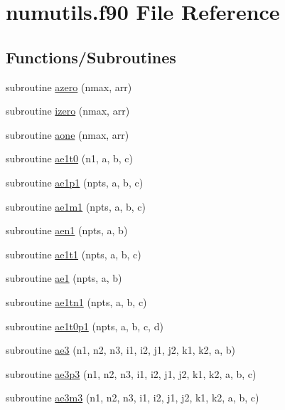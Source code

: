 \hypertarget{numutils_8f90}{}\section{numutils.\+f90 File Reference}
\label{numutils_8f90}
\subsection*{Functions/\+Subroutines}
\begin{DoxyCompactItemize}
\item 
subroutine \hyperlink{numutils_8f90_aedf1cc89dc909310c02cc91211d9fb7d}{azero} (nmax, arr)
\item 
subroutine \hyperlink{numutils_8f90_a243763ba39075144d9a5be345786f5e6}{izero} (nmax, arr)
\item 
subroutine \hyperlink{numutils_8f90_a5f11a24165b90f564a7957b1330dcde9}{aone} (nmax, arr)
\item 
subroutine \hyperlink{numutils_8f90_a632511268b668eada5b28547505588ea}{ae1t0} (n1, a, b, c)
\item 
subroutine \hyperlink{numutils_8f90_a3dccc50fe1020197e1bc1c5d3fbfc7ef}{ae1p1} (npts, a, b, c)
\item 
subroutine \hyperlink{numutils_8f90_a9a91a62259d04e65fec91c0f8281d95c}{ae1m1} (npts, a, b, c)
\item 
subroutine \hyperlink{numutils_8f90_acaff77dcb65ab75b93324b2a92a1499a}{aen1} (npts, a, b)
\item 
subroutine \hyperlink{numutils_8f90_a29ac6885fb4a3c6093132bd783825e03}{ae1t1} (npts, a, b, c)
\item 
subroutine \hyperlink{numutils_8f90_a4d867e512846ee517e9c10e9b3582f2c}{ae1} (npts, a, b)
\item 
subroutine \hyperlink{numutils_8f90_a094b45663d0a95b17c42693408a29f72}{ae1tn1} (npts, a, b, c)
\item 
subroutine \hyperlink{numutils_8f90_a339813f06349a1aa61922ad64011c902}{ae1t0p1} (npts, a, b, c, d)
\item 
subroutine \hyperlink{numutils_8f90_aec5d72dc4227bdb7e90f6014039e465f}{ae3} (n1, n2, n3, i1, i2, j1, j2, k1, k2, a, b)
\item 
subroutine \hyperlink{numutils_8f90_a35b613da5ca403328e2104420fba8386}{ae3p3} (n1, n2, n3, i1, i2, j1, j2, k1, k2, a, b, c)
\item 
subroutine \hyperlink{numutils_8f90_a891910491699ce7098ff47e01623e294}{ae3m3} (n1, n2, n3, i1, i2, j1, j2, k1, k2, a, b, c)
\item 

\end{DoxyCompactItemize}
